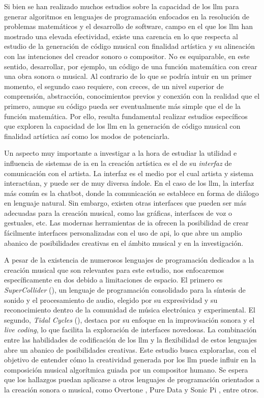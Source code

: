 Si bien se han realizado muchos estudios sobre la capacidad de los \gls{llm} para generar algoritmos en lenguajes de programación enfocados en la resolución de problemas matemáticos y el desarrollo de {software}, campo en el que los \gls{llm} han mostrado una elevada efectividad, existe una carencia en lo que respecta al estudio de la generación de código musical con finalidad artística y su alineación con las intenciones del creador sonoro o compositor. No es equiparable, en este sentido, desarrollar, por ejemplo, un código de una función matemática con crear una obra sonora o musical. Al contrario de lo que se podría intuir en un primer momento, el segundo caso requiere, con creces, de un nivel superior de comprensión, abstracción, conocimientos previos y conexión con la realidad que el primero, aunque su código pueda ser eventualmente más simple que el de la función matemática. Por ello, resulta fundamental realizar estudios específicos que exploren la capacidad de los \gls{llm} en la generación de código musical con finalidad artística así como los modos de potenciarla.

Un aspecto muy importante a investigar a la hora de estudiar la utilidad e influencia de sistemas de \gls{ia} en la creación artística es el de su \emph{interfaz} de comunicación con el artista. La interfaz es el medio por el cual artista y sistema interactúan, y puede ser de muy diversa índole. En el caso de los \gls{llm}, la interfaz más común es la {chatbot}, donde la comunicación se establece en forma de diálogo en lenguaje natural. Sin embargo, existen otras interfaces que pueden ser más adecuadas para la creación musical, como las gráficas, interfaces de voz o gestuales, etc. Las modernas herramientas de \gls{ia} ofrecen la posibilidad de crear fácilmente interfaces personalizadas con el uso de \gls{api}, lo que abre un amplio abanico de posibilidades creativas en el ámbito musical y en la investigación.

A pesar de la existencia de numerosos lenguajes de programación dedicados a la creación musical que son relevantes para este estudio, nos enfocaremos específicamente en dos debido a limitaciones de espacio. El primero es \emph{SuperCollider} (\citeyear{SuperCollider2024}), un lenguaje de programación consolidado para la síntesis de sonido y el procesamiento de audio, elegido por su expresividad y su reconocimiento dentro de la comunidad de música electrónica y experimental. El segundo, \emph{Tidal Cycles} (\citeyear{TidalCycles}), destaca por su enfoque en la improvisación sonora y el \emph{live coding}, lo que facilita la exploración de interfaces novedosas. La combinación entre las habilidades de codificación de los \gls{llm} y la flexibilidad de estos lenguajes abre un abanico de posibilidades creativas. Este estudio busca explorarlas, con el objetivo de entender cómo la creatividad generada por los \gls{llm} puede influir en la composición musical algorítmica guiada por un compositor humano. Se espera que los hallazgos puedan aplicarse a otros lenguajes de programación orientados a la creación sonora o musical, como {Overtone} \citep{OvertoneCollaborativeProgrammable}, {Pure Data} \citep{PureDataPd} y {Sonic Pi} \citep{SonicPiLive}, entre otros.

